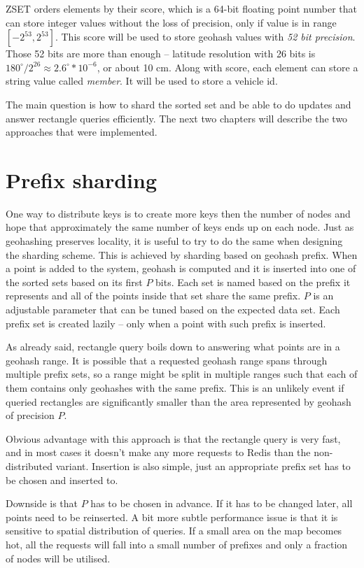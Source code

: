 \documentclass[times, utf8, diplomski]{fer}
\begin{document}
ZSET orders elements by their score, which is a 64-bit floating point number that can store integer values without the loss of precision, only if value is in range $[-2^{53}, 2^{53}]$. This score will be used to store geohash values with \emph{52 bit precision}. Those 52 bits are more than enough -- latitude resolution with 26 bits is $180^{\circ}/2^{26} \approx 2.6^{\circ}*10^{-6}$, or about 10 cm. Along with score, each element can store a string value called \emph{member}. It will be used to store a vehicle id.


The main question is how to shard the sorted set and be able to do updates and answer rectangle queries efficiently. The next two chapters will describe the two approaches that were implemented.


\chapter {Prefix sharding}
One way to distribute keys is to create more keys then the number of nodes and hope that approximately the same number of keys ends up on each node. Just as geohashing preserves locality, it is useful to try to do the same when designing the sharding scheme. This is achieved by sharding based on geohash prefix. When a point is added to the system, geohash is computed and it is inserted into one of the sorted sets based on its first $P$ bits. Each set is named based on the prefix it represents and all of the points inside that set share the same prefix. $P$ is an adjustable parameter that can be tuned based on the expected data set. Each prefix set is created lazily -- only when a point with such prefix is inserted.

As already said, rectangle query boils down to answering what points are in a geohash range. It is possible that a requested geohash range spans through multiple prefix sets, so a range might be split in multiple ranges such that each of them contains only geohashes with the same prefix. This is an unlikely event if queried rectangles are significantly smaller than the area represented by geohash of precision $P$.

Obvious advantage with this approach is that the rectangle query is very fast, and in most cases it doesn't make any more requests to Redis than the non-distributed variant. Insertion is also simple, just an appropriate prefix set has to be chosen and inserted to.

Downside is that $P$ has to be chosen in advance. If it has to be changed later, all points need to be reinserted. A bit more subtle performance issue is that it is sensitive to spatial distribution of queries. If a small area on the map becomes hot, all the requests will fall into a small number of prefixes and only a fraction of nodes will be utilised.
\end{document}
